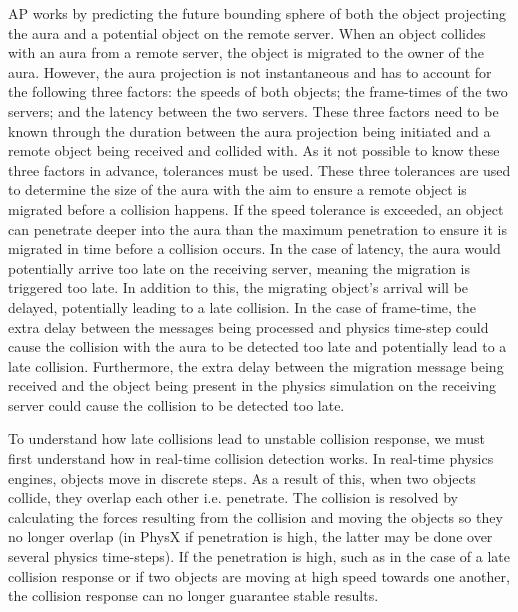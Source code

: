 AP works by predicting the future bounding sphere of both the object projecting the aura and a potential object on the remote server. When an object collides with an aura from a remote server, the object is migrated to the owner of the aura. However, the aura projection is not instantaneous and has to account for the following three factors: the speeds of both objects; the frame-times of the two servers; and the latency between the two servers. These three factors need to be known through the duration between the aura projection being initiated and a remote object being received and collided with. As it not possible to know these three factors in advance, tolerances must be used. These three tolerances are used to determine the size of the aura with the aim to ensure a remote object is migrated before a collision happens. If the speed tolerance is exceeded, an object can penetrate deeper into the aura than the maximum penetration to ensure it is migrated in time before a collision occurs. In the case of latency, the aura would potentially arrive too late on the receiving server, meaning the migration is triggered too late. In addition to this, the migrating object's arrival will be delayed, potentially leading to a late collision. In the case of frame-time, the extra delay between the messages being processed and physics time-step could cause the collision with the aura to be detected too late and potentially lead to a late collision. Furthermore, the extra delay between the migration message being received and the object being present in the physics simulation on the receiving server could cause the collision to be detected too late.


To understand how late collisions lead to unstable collision response, we must first understand how in real-time collision detection works. In real-time physics engines, objects move in discrete steps. As a result of this, when two objects collide, they overlap each other i.e. penetrate. The collision is resolved by calculating the forces resulting from the collision and moving the objects so they no longer overlap (in PhysX if penetration is high, the latter may be done over several physics time-steps). If the penetration is high, such as in the case of a late collision response or if two objects are moving at high speed towards one another, the collision response can no longer guarantee stable results.

